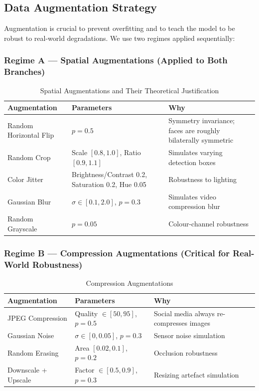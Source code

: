 \documentclass[12pt,a4paper]{article}
\begin{document}
\subsection{Data Augmentation Strategy}

Augmentation is crucial to prevent overfitting and to teach the model to be robust to
real-world degradations. We use two regimes applied sequentially:

\subsubsection{Regime A --- Spatial Augmentations (Applied to Both Branches)}

\begin{table}[h]
\centering
\caption{Spatial Augmentations and Their Theoretical Justification}
\begin{tabularx}{\textwidth}{lXX}
\toprule
\textbf{Augmentation} & \textbf{Parameters} & \textbf{Why} \\
\midrule
Random Horizontal Flip & $p = 0.5$ & Symmetry invariance; faces are roughly bilaterally symmetric \\
Random Crop & Scale $[0.8, 1.0]$, Ratio $[0.9, 1.1]$ & Simulates varying detection boxes \\
Color Jitter & Brightness/Contrast 0.2, Saturation 0.2, Hue 0.05 & Robustness to lighting \\
Gaussian Blur & $\sigma \in [0.1, 2.0]$, $p = 0.3$ & Simulates video compression blur \\
Random Grayscale & $p = 0.05$ & Colour-channel robustness \\
\bottomrule
\end{tabularx}
\end{table}

\subsubsection{Regime B --- Compression Augmentations (Critical for Real-World Robustness)}

\begin{table}[h]
\centering
\caption{Compression Augmentations}
\begin{tabularx}{\textwidth}{lXX}
\toprule
\textbf{Augmentation} & \textbf{Parameters} & \textbf{Why} \\
\midrule
JPEG Compression & Quality $\in [50, 95]$, $p = 0.5$ & Social media always re-compresses images \\
Gaussian Noise & $\sigma \in [0, 0.05]$, $p = 0.3$ & Sensor noise simulation \\
Random Erasing & Area $[0.02, 0.1]$, $p = 0.2$ & Occlusion robustness \\
Downscale + Upscale & Factor $\in [0.5, 0.9]$, $p = 0.3$ & Resizing artefact simulation \\
\bottomrule
\end{tabularx}
\end{table}
\end{document}
